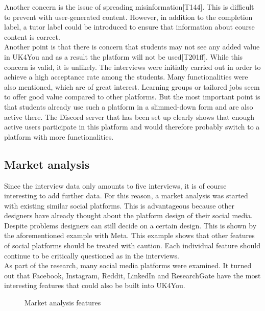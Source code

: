 Another concern is the issue of spreading misinformation[T144].
This is difficult to prevent with user-generated content.
However, in addition to the completion label, a tutor label could be introduced to ensure that information about course content is correct.\\

Another point is that there is concern that students may not see any added value in UK4You and as a result the platform will not be used[T201ff].
While this concern is valid, it is unlikely.
The interviews were initially carried out in order to achieve a high acceptance rate among the students.
Many functionalities were also mentioned, which are of great interest.
Learning groups or tailored jobs seem to offer good value compared to other platforms.
But the most important point is that students already use such a platform in a slimmed-down form and are also active there.
The Discord server that has been set up clearly shows that enough active users participate in this platform and would therefore probably switch to a platform with more functionalities.

\subsection{Market analysis}
Since the interview data only amounts to five interviews, it is of course interesting to add further data.
For this reason, a market analysis was started with existing similar social platforms.
This is advantageous because other designers have already thought about the platform design of their social media.
Despite problems designers can still decide on a certain design.
This is shown by the aforementioned example with Meta.
This example shows that other features of social platforms should be treated with caution.
Each individual feature should continue to be critically questioned as in the interviews.\\

As part of the research, many social media platforms were examined.
It turned out that Facebook, Instagram, Reddit, LinkedIn and ResearchGate have the most interesting features that could also be built into UK4You.

\begin{figure}[ht]
    \centering
    \caption{Market analysis features}
    \label{fig:market-analysis}
\end{figure}

